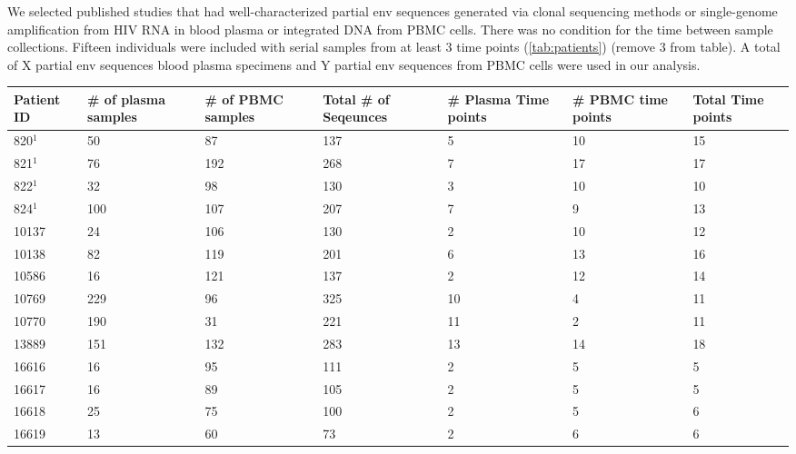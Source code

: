 We selected published studies that had well-characterized partial env sequences generated via clonal sequencing methods or single-genome amplification from HIV RNA in blood plasma or integrated DNA from PBMC cells. There was no condition for the time between sample collections. Fifteen individuals were included with serial samples from at least 3 time points (\ref{tab:patients}) (remove 3 from table). A total of X partial env sequences blood plasma specimens and Y partial env sequences from PBMC cells were used in our analysis.

\begin{table*}[!ht]\label{tab:patients} 
\def\arraystretch{1.3}%
\begin{tabularx}{\textwidth}{ X | X | X | X | X | X | X } 
\hline
\hline
Patient ID & \# of plasma samples & \# of PBMC samples & Total \# of Seqeunces & \# Plasma Time points & \# PBMC time points & Total Time points   \\ \hline \hline
820$^1$ &       50 &       87 &      137 &        5 &       10 &       15  \\
821$^1$ &       76 &      192 &      268 &        7 &       17 &       17   \\ 
822$^1$ &       32 &       98 &      130 &        3 &       10 &       10   \\ 
824$^1$ &      100 &      107 &      207 &        7 &        9 &       13   \\ 
10137 &       24 &      106 &      130 &        2 &       10 &       12  \\ 
10138 &       82 &      119 &      201 &        6 &       13 &       16  \\
10586 &       16 &      121 &      137 &        2 &       12 &       14  \\ 
10769 &      229 &       96 &      325 &       10 &        4 &       11  \\ 
10770 &      190 &       31 &      221 &       11 &        2 &       11  \\ 
13889 &      151 &      132 &      283 &       13 &       14 &       18  \\ 
16616 &       16 &       95 &      111 &        2 &        5 &        5  \\ 
16617 &       16 &       89 &      105 &        2 &        5 &        5  \\ 
16618 &       25 &       75 &      100 &        2 &        5 &        6  \\ 
16619 &       13 &       60 &       73 &        2 &        6 &        6  \\ 

\end{tabularx}
\end{table*}
